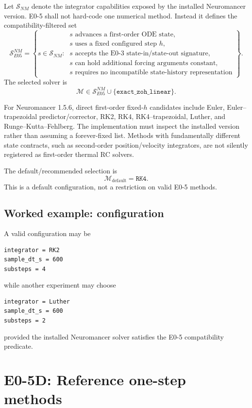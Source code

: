 \documentclass[11pt]{article}
\begin{document}
Let $\mathcal S_{NM}$ denote the integrator capabilities exposed by the installed
Neuromancer version. E0-5 shall not hard-code one numerical method. Instead it
defines the compatibility-filtered set
\[
\boxed{
\mathcal S_{E05}^{NM}
=
\left\{
s\in\mathcal S_{NM}:\
\begin{array}{l}
s\text{ advances a first-order ODE state},\\
s\text{ uses a fixed configured step }h,\\
s\text{ accepts the E0-3 state-in/state-out signature},\\
s\text{ can hold additional forcing arguments constant},\\
s\text{ requires no incompatible state-history representation}
\end{array}
\right\}.
}
\]
The selected solver is
\[
\boxed{
\mathcal M\in\mathcal S_{E05}^{NM}\cup\{\texttt{exact\_zoh\_linear}\}.
}
\]

For Neuromancer 1.5.6, direct first-order fixed-$h$ candidates include Euler,
Euler--trapezoidal predictor/corrector, RK2, RK4, RK4--trapezoidal,
Luther, and Runge--Kutta--Fehlberg. The implementation must inspect the installed
version rather than assuming a forever-fixed list. Methods with fundamentally
different state contracts, such as second-order position/velocity integrators,
are not silently registered as first-order thermal RC solvers.

The default/recommended selection is
\[
\boxed{\mathcal M_{\mathrm{default}}=\texttt{RK4}.}
\]
This is a default configuration, not a restriction on valid E0-5 methods.

\subsection*{Worked example: configuration}
A valid configuration may be
\begin{verbatim}
integrator = RK2
sample_dt_s = 600
substeps = 4
\end{verbatim}
while another experiment may choose
\begin{verbatim}
integrator = Luther
sample_dt_s = 600
substeps = 2
\end{verbatim}
provided the installed Neuromancer solver satisfies the E0-5 compatibility
predicate.

\section{E0-5D: Reference one-step methods}
\end{document}
